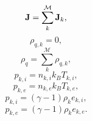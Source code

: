 \documentclass[a4paper,11pt]{report}
\begin{document}
\begin{equation}
    \mathbf{J} = \sum_k^\mathcal{M} \mathbf{J}_k,
\end{equation}
\begin{equation}
    \label{eq:sf_mm_ms_mass_density_final}
    \rho_{q,k} = 0,
\end{equation}
\begin{equation}
    \rho_q = \sum_k^\mathcal{M} \rho_{q,k},
\end{equation}
\begin{equation}
    \label{eq:sf_mm_ms_therm_eos_ion_final}
    p_{k,i} = n_{k,i} k_B T_{k,i},
\end{equation}
\begin{equation}
    \label{eq:sf_mm_ms_therm_eos_elec_final}
    p_{k,e} = n_{k,e} k_B T_{k,e},
\end{equation}
\begin{equation}
    \label{eq:sf_mm_ms_calo_eos_ion_final}
    p_{k,i} = (\gamma - 1) \rho_k e_{k,i},
\end{equation}
\begin{equation}
    \label{eq:sf_mm_ms_calo_eos_elec_final}
    p_{k,e} = (\gamma - 1) \rho_k e_{k,e}.
\end{equation}
\end{document}
